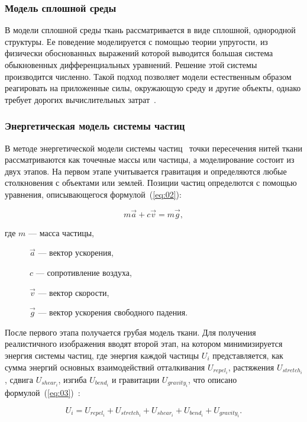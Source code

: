 \subsubsection{Модель сплошной среды}

В модели сплошной среды ткань рассматривается в виде сплошной, однородной
структуры. Ее поведение моделируется с помощью теории упругости, из физически
обоснованных выражений которой выводится большая система обыкновенных
дифференциальных уравнений. Решение этой системы производится численно. Такой
подход позволяет модели естественным образом реагировать на приложенные силы,
окружающую среду и другие объекты, однако требует дорогих вычислительных
затрат~\cite{bib12, bib15}.

\subsubsection{Энергетическая модель системы частиц}

В методе энергетической модели системы частиц~\cite{bib13} точки пересечения
нитей ткани рассматриваются как точечные массы или частицы, а моделирование
состоит из двух этапов. На первом этапе учитывается гравитация и  определяются
любые столкновения с объектами или землей. Позиции частиц определются с помощью
уравнения, описывающегося формулой~(\ref{eq:02}):

\begin{equation}\label{eq:02}
    m\vec{a}+c\vec{v}=m\vec{g},
\end{equation}

где $m$ --- масса частицы,

~~~~~~$\vec{a}$ --- вектор ускорения,

~~~~~~$c$ --- сопротивление воздуха,

~~~~~~$\vec{v}$ --- вектор скорости,

~~~~~~$\vec{g}$ --- вектор ускорения свободного падения.

После первого этапа получается грубая модель ткани. Для получения реалистичного
изображения вводят второй этап, на котором минимизируется энергия системы
частиц, где энергия каждой частицы $U_i$ представляется, как сумма энергий
основных взаимодействий отталкивания $U_{repel_i}$, растяжения $U_{stretch_i}$,
сдвига $U_{shear_i}$, изгиба $U_{bend_i}$ и гравитации
$U_{gravity_i}$, что описано формулой~(\ref{eq:03})~\cite{bib07}:

\begin{equation}\label{eq:03}
U_i=U_{repel_i}+U_{stretch_i}+U_{shear_i}+U_{bend_i}+U_{gravity_i}.
\end{equation}

